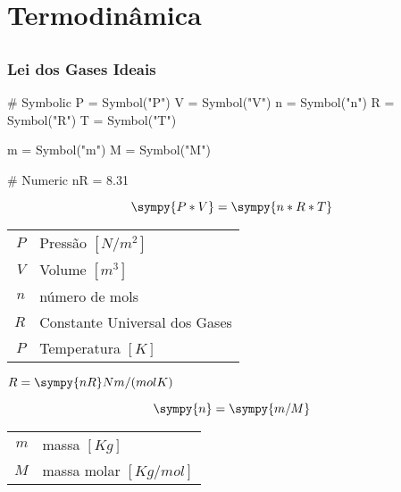 \documentclass[a4paper,twocolumn,11pt]{book}
\title{\tituloRelatorio}
\begin{document}
\maketitle
\tableofcontents
\chapter{Termodinâmica} 
\section{}
\subsection{Lei dos Gases Ideais}
\begin{sympycode}
# Symbolic
P = Symbol("P")
V = Symbol("V")
n = Symbol("n")
R = Symbol("R")
T = Symbol("T")

m = Symbol("m")
M = Symbol("M")

# Numeric
nR = 8.31
\end{sympycode}

\begin{equation}
\sympy{P*V} = \sympy{n*R*T}
\end{equation}

\begin{table}[H]
\begin{tabular}{r@{ : }l}
$P$ & Pressão $[N/m^2]$ \\
$V$ & Volume $[m^3]$ \\
$n$ & número de mols \\
$R$ & Constante Universal dos Gases \\
$P$ & Temperatura $[K]$ \\
\end{tabular}
\end{table}

$R = \sympy{nR} Nm/(mol K)$

\begin{equation}
\sympy{n} = \sympy{m/M}
\end{equation}

\begin{table}[H]
\begin{tabular}{r@{ : }l}
$m$ & massa $[Kg]$ \\
$M$ & massa molar $[Kg/mol]$ \\
\end{tabular}
\end{table}
\end{document}
